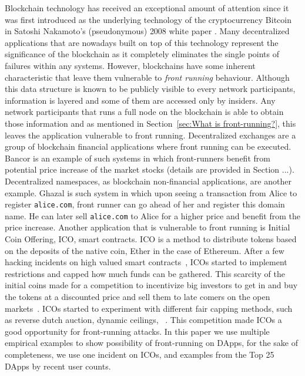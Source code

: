 Blockchain technology has received an exceptional amount of attention since it was first introduced as the underlying technology of the cryptocurrency Bitcoin in Satoshi Nakamoto's (pseudonymous) 2008 white paper \cite{nakamoto2008bitcoin}. Many decentralized applications that are nowadays built on top of this technology represent the significance of the blockchain as it completely eliminates the single points of failures within any systems. However, blockchains have some inherent characteristic that leave them vulnerable to \emph{front running} behaviour. Although this data structure is known to be publicly visible to every network participants, information is layered  and some of them are accessed only by insiders. Any network participants that runs a full node on the blockchain is able to obtain those information and as mentioned in Section~\ref{sec:What is front-running?}, this leaves the application vulnerable to front running. Decentralized exchanges are a group of blockchain financial applications where front running can be executed. Bancor \cite{hertzog2017bancor} is an example of such systems in which front-runners benefit from potential price increase of the market stocks (details are provided in Section ...). Decentralized namespaces, as blockchain non-financial applications, are another example. Ghazal \cite{moosavighazal} is such system in which upon seeing a transaction from Alice to register \texttt{alice.com}, front runner can go ahead of her and register this domain name. He can later sell \texttt{alice.com} to Alice for a higher price and benefit from the price increase.
Another application that is vulnerable to front running is Initial Coin Offering, ICO, smart contracts. ICO is a method to distribute tokens based on the deposits of the native coin, Ether in the case of Ethereum. After a few hacking incidents on high valued smart contracts~\cite{siegel2016daohack}, ICOs started to implement restrictions and capped how much funds can be gathered. This scarcity of the initial coins made for a competition to incentivize big investors to get in and buy the tokens at a discounted price and sell them to late comers on the open markets~\cite{zetzsche2018ico, li2018initial}. ICOs started to experiment with different fair capping methods, such as reverse dutch auction, dynamic ceilings, \eg ~\cite{kaal2017initial}.  This competition made ICOs a good opportunity for front-running attacks.  In this paper we use multiple empirical examples to show possibility of front-running on DApps, for the sake of completeness, we use one incident on ICOs, and examples from the Top 25 DApps by recent user counts. %


